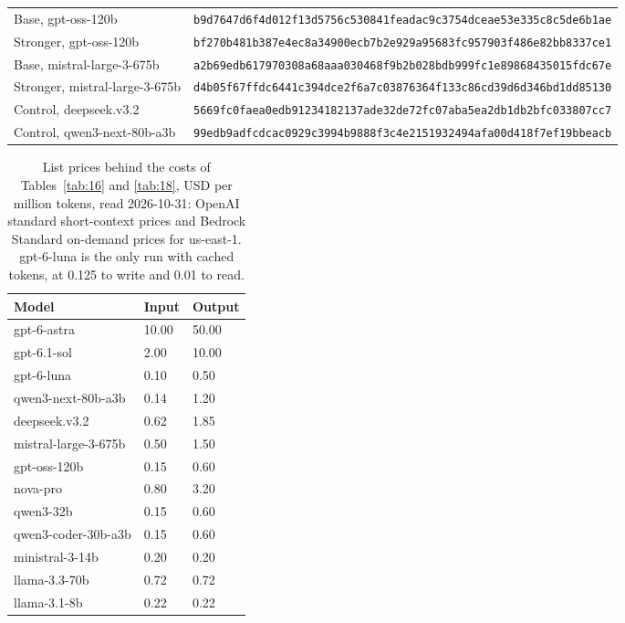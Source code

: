 \documentclass[11pt]{article}
\begin{document}
\begin{table}[!htb]
\begin{tabularx}{\linewidth}{@{}Yl@{}}
Base, gpt-oss-120b & \texttt{b9d7647d6f4d012f13d5756c530841feadac9c3754dceae53e335c8c5de6b1ae} \\
Stronger, gpt-oss-120b & \texttt{bf270b481b387e4ec8a34900ecb7b2e929a95683fc957903f486e82bb8337ce1} \\
Base, mistral-large-3-675b & \texttt{a2b69edb617970308a68aaa030468f9b2b028bdb999fc1e89868435015fdc67e} \\
Stronger, mistral-large-3-675b & \texttt{d4b05f67ffdc6441c394dce2f6a7c03876364f133c86cd39d6d346bd1dd85130} \\
Control, deepseek.v3.2 & \texttt{5669fc0faea0edb91234182137ade32de72fc07aba5ea2db1db2bfc033807cc7} \\
Control, qwen3-next-80b-a3b & \texttt{99edb9adfcdcac0929c3994b9888f3c4e2151932494afa00d418f7ef19bbeacb} \\
\bottomrule
\end{tabularx}
\end{table}

\begin{table}[!htb]
\caption{List prices behind the costs of Tables~\ref{tab:16} and \ref{tab:18}, USD per million tokens, read 2026-10-31: OpenAI standard short-context prices and Bedrock Standard on-demand prices for us-east-1. gpt-6-luna is the only run with cached tokens, at 0.125 to write and 0.01 to read.}\label{tab:28}
\small
\begin{tabularx}{\linewidth}{@{}Yll@{}}
\toprule
\textbf{Model} & \textbf{Input} & \textbf{Output} \\ \midrule
gpt-6-astra & 10.00 & 50.00 \\
gpt-6.1-sol & 2.00 & 10.00 \\
gpt-6-luna & 0.10 & 0.50 \\
qwen3-next-80b-a3b & 0.14 & 1.20 \\
deepseek.v3.2 & 0.62 & 1.85 \\
mistral-large-3-675b & 0.50 & 1.50 \\
gpt-oss-120b & 0.15 & 0.60 \\
nova-pro & 0.80 & 3.20 \\
qwen3-32b & 0.15 & 0.60 \\
qwen3-coder-30b-a3b & 0.15 & 0.60 \\
ministral-3-14b & 0.20 & 0.20 \\
llama-3.3-70b & 0.72 & 0.72 \\
llama-3.1-8b & 0.22 & 0.22 \\
\bottomrule
\end{tabularx}
\end{table}
\end{document}
